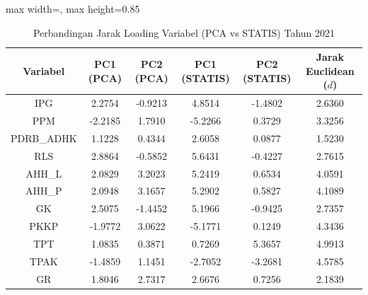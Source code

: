 \begin{table}[H]
\centering
\caption{Perbandingan Jarak Loading Variabel (PCA vs STATIS) Tahun 2021} \label{tab:appjarak_loading_2021}
\begin{adjustbox}{max width=\textwidth, max height=0.85\textheight}
\begin{tabular}{|c|c|c|c|c|c|}
\hline
\textbf{Variabel} & \textbf{PC1 (PCA)} & \textbf{PC2 (PCA)} & \textbf{PC1 (STATIS)} & \textbf{PC2 (STATIS)} & \textbf{Jarak Euclidean ($d$)} \\
\hline
IPG & 2.2754 & -0.9213 & 4.8514 & -1.4802 & 2.6360 \\
PPM & -2.2185 & 1.7910 & -5.2266 & 0.3729 & 3.3256 \\
PDRB\_ADHK & 1.1228 & 0.4344 & 2.6058 & 0.0877 & 1.5230 \\
RLS & 2.8864 & -0.5852 & 5.6431 & -0.4227 & 2.7615 \\
AHH\_L & 2.0829 & 3.2023 & 5.2419 & 0.6534 & 4.0591 \\
AHH\_P & 2.0948 & 3.1657 & 5.2902 & 0.5827 & 4.1089 \\
GK & 2.5075 & -1.4452 & 5.1966 & -0.9425 & 2.7357 \\
PKKP & -1.9772 & 3.0622 & -5.1771 & 0.1249 & 4.3436 \\
TPT & 1.0835 & 0.3871 & 0.7269 & 5.3657 & 4.9913 \\
TPAK & -1.4859 & 1.1451 & -2.7052 & -3.2681 & 4.5785 \\
GR & 1.8046 & 2.7317 & 2.6676 & 0.7256 & 2.1839 \\
\hline
\end{tabular}
\end{adjustbox}
\end{table}
